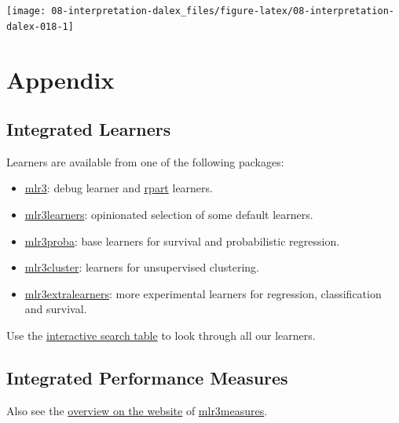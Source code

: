 \documentclass[
]{scrbook}
\providecommand{\tightlist}{%
  \setlength{\itemsep}{0pt}\setlength{\parskip}{0pt}}
\begin{document}
\begin{center}\texttt{[image: 08-interpretation-dalex\_files/figure-latex/08-interpretation-dalex-018-1]} \end{center}

\hypertarget{appendix}{%
\chapter{Appendix}\label{appendix}}

\hypertarget{list-learners}{%
\section{Integrated Learners}\label{list-learners}}

Learners are available from one of the following packages:

\begin{itemize}
\tightlist
\item
  \href{https://mlr3.mlr-org.com}{mlr3}: debug learner and \href{https://cran.r-project.org/package=rpart}{rpart} learners.
\item
  \href{https://mlr3learners.mlr-org.com}{mlr3learners}: opinionated selection of some default learners.
\item
  \href{https://mlr3proba.mlr-org.com}{mlr3proba}: base learners for survival and probabilistic regression.
\item
  \href{https://mlr3cluster.mlr-org.com}{mlr3cluster}: learners for unsupervised clustering.
\item
  \href{https://mlr3extralearners.mlr-org.com}{mlr3extralearners}: more experimental learners for regression, classification and survival.
\end{itemize}

Use the \href{https://mlr3extralearners.mlr-org.com/articles/learners/list_learners.html}{interactive search table} to look through all our learners.

\hypertarget{list-measures}{%
\section{Integrated Performance Measures}\label{list-measures}}

Also see the \href{https://mlr3measures.mlr-org.com/reference/}{overview on the website} of \href{https://cran.r-project.org/package=mlr3measures}{mlr3measures}.
\end{document}
